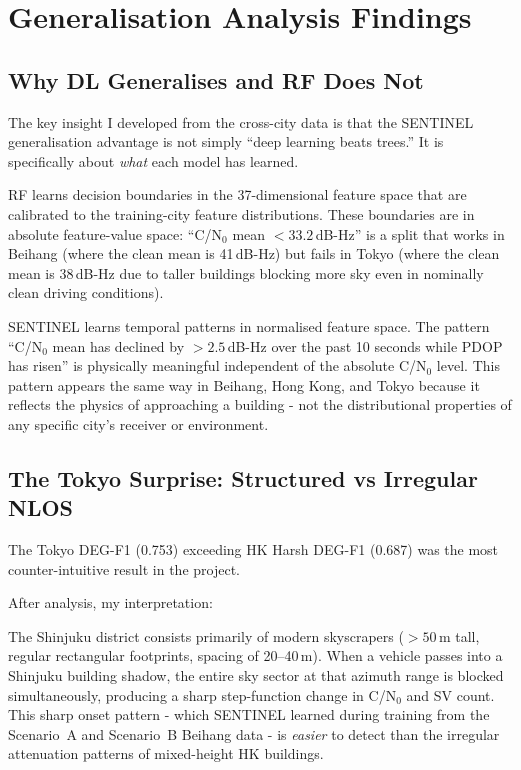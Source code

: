 \documentclass[12pt,a4paper]{article}
\begin{document}
\section{Generalisation Analysis Findings}

\subsection{Why DL Generalises and RF Does Not}

The key insight I developed from the cross-city data is that the SENTINEL generalisation
advantage is not simply ``deep learning beats trees.''
It is specifically about \emph{what} each model has learned.

RF learns decision boundaries in the 37-dimensional feature space that are calibrated
to the training-city feature distributions.
These boundaries are in absolute feature-value space:
``C/N$_0$ mean $< 33.2$\,dB-Hz'' is a split that works in Beihang (where the clean
mean is 41\,dB-Hz) but fails in Tokyo (where the clean mean is 38\,dB-Hz due to taller
buildings blocking more sky even in nominally clean driving conditions).

SENTINEL learns temporal patterns in normalised feature space.
The pattern ``C/N$_0$ mean has declined by $> 2.5$\,dB-Hz over the past 10 seconds
while PDOP has risen'' is physically meaningful independent of the absolute C/N$_0$
level.
This pattern appears the same way in Beihang, Hong Kong, and Tokyo because it reflects
the physics of approaching a building - not the distributional properties of any
specific city's receiver or environment.

\subsection{The Tokyo Surprise: Structured vs Irregular NLOS}

The Tokyo DEG-F1 (0.753) exceeding HK Harsh DEG-F1 (0.687) was the most
counter-intuitive result in the project.

After analysis, my interpretation:

The Shinjuku district consists primarily of modern skyscrapers ($> 50$\,m tall,
regular rectangular footprints, spacing of 20--40\,m).
When a vehicle passes into a Shinjuku building shadow, the entire sky sector at that
azimuth range is blocked simultaneously, producing a sharp step-function change in C/N$_0$
and SV count.
This sharp onset pattern - which SENTINEL learned during training from the Scenario~A
and Scenario~B Beihang data - is \emph{easier} to detect than the irregular attenuation
patterns of mixed-height HK buildings.
\end{document}
